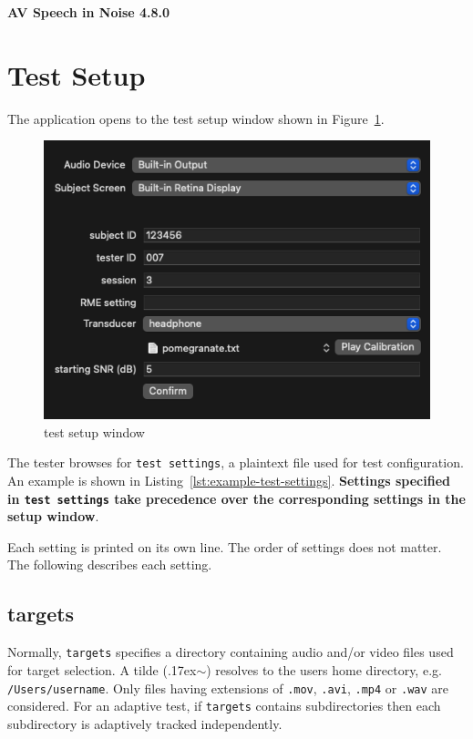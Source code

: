 \documentclass[11pt,pdftex,letterpaper]{article}
\newcommand{\mytilde}{\raise.17ex\hbox{$\scriptstyle\mathtt{\sim}$}}
\begin{document}
\vspace*{30ex}
\begin{center}
\textbf{AV Speech in Noise 4.8.0}
\end{center}
\pagebreak
\tableofcontents
\pagebreak

\section{Test Setup}
The application opens to the test setup window shown in Figure~\ref{fig:test-setup-window}.
\begin{figure}
	\centering
	\includegraphics[width = 0.9\linewidth]{test-setup-window.png}
	\caption{test setup window}
	\label{fig:test-setup-window}
\end{figure}
The tester browses for \texttt{test settings}, a plaintext file used for test configuration. An example is shown in Listing~\ref{lst:example-test-settings}. \textbf{Settings specified in \texttt{test settings} take precedence over the corresponding settings in the setup window}.

\noindent\begin{minipage}{\textwidth}
	
\end{minipage}
Each setting is printed on its own line. The order of settings does not matter. The following describes each setting.
\subsection{targets}
Normally, \texttt{targets} specifies a directory containing audio and/or video files used for target selection. A tilde (\mytilde) resolves to the users home directory, e.g. \texttt{/Users/username}. Only files having extensions of \texttt{.mov}, \texttt{.avi}, \texttt{.mp4} or \texttt{.wav} are considered. For an adaptive test, if \texttt{targets} contains subdirectories then each subdirectory is adaptively tracked independently.
\end{document}

